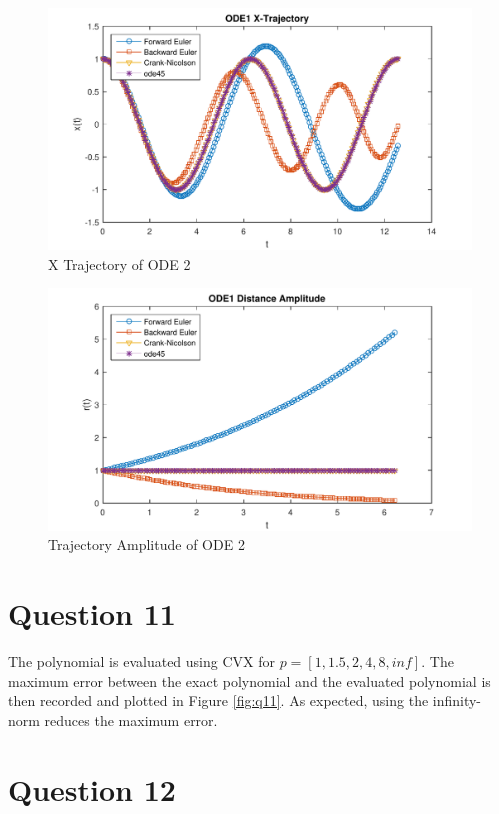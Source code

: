 \documentclass[letterpaper,12pt,]{article}
\begin{document}
\begin{figure}
    \centering
    \includegraphics[height=0.4\textheight]{XTraj2}
    \caption{X Trajectory of ODE 2}
    \label{fig:x2}
\end{figure}

\begin{figure}
    \centering
    \includegraphics[height=0.4\textheight]{R2}
    \caption{Trajectory Amplitude of ODE 2}
    \label{fig:r2}
\end{figure}

\section*{Question 11}

The polynomial is evaluated using CVX for $p = [1, 1.5, 2, 4, 8, inf]$. The maximum error between the exact polynomial and the evaluated polynomial is then recorded and plotted in Figure \ref{fig:q11}. As expected, using the infinity-norm reduces the maximum error.

\section*{Question 12}
\end{document}
